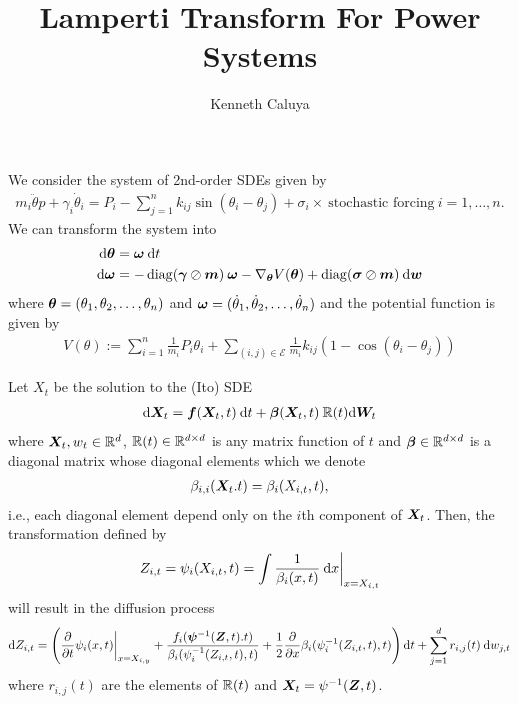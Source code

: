\documentclass[11pt,twoside,a4paper]{article}
\begin{document}
\title{\huge{Lamperti Transform For Power Systems
}}

\author{Kenneth Caluya}

\markboth{\today}{}

\maketitle
We consider the system of 2nd-order SDEs given by
\begin{align*}
    m_i\ddot{\theta}p
    +  \gamma_i \dot{\theta}_i = 
P_i - \sum_{j=1}^{n} k_{ij} \sin(\theta_i-\theta_j)+ \sigma_i \times \:\text{stochastic forcing}\: i=1,\dots,n.
\end{align*}
We can transform the system into 
\begin{align} \label{ODEsystem}
    {\rm{d}} {\bm{\theta}} &= {\bm{\omega}} \: {\rm{d}} t \nonumber \\ 
    {\rm{d}} {\bm{\omega}} & = -\operatorname{diag}({\bm{\gamma}} \oslash {\bm{m}})\: {\bm{\omega}}-\nabla_{{\bm{\theta}}} V({\bm{\theta}}) + \operatorname{diag}({\bm{\sigma}} \oslash {\bm{m}}) \: {\rm{d}} {\bm{w}}
\end{align}
where ${\bm{\theta}}=(\theta_1,\theta_2,\dots,\theta_n)$ and ${\bm{\omega}}=(\dot{\theta}_1,\dot{\theta}_2,\dots,\dot{\theta}_n)$ and the potential function is given by 
\begin{align}
    V(\theta):= \sum_{i=1}^{n} \frac{1}{m_i}P_i \theta_i + \sum_{(i,j)\in \mathcal{E}}\frac{1}{m_i}k_{ij}(1-\cos(\theta_i-\theta_j))
\end{align}
\begin{thm} \label{LampertiTransform} Let $X_t$ be the solution to the (Ito) SDE 
\begin{align}
    {\rm{d}} {\bm{X}}_t = {\bm{f}}({\bm{X}}_t,t) \: 
    {\rm{d}} t + {\bm{\beta}}({\bm{X}}_t,t) \: \mathbb{R}(t){\rm{d}} \bm{W}_t
\end{align}
where ${\bm{X}}_t,w_t \in \mathbb{R}^d$, $\mathbb{R}(t)\in \mathbb{R}^{d \times d}$ is any matrix function of $t$ and ${\bm{\beta}} \in \mathbb{R}^{d \times d} $ is a diagonal matrix whose diagonal elements which we denote 
\begin{align*}
    \beta_{i,i}({\bm{X}}_t.t)= \beta_i(X_{i,t},t),
\end{align*}
i.e., each diagonal element depend only on the $i$th component of ${\bm{X}}_t$. Then, the transformation defined by 
\begin{align} \label{ChangeofVariable}
Z_{i,t} = \psi_i(X_{i,t},t) = \int \frac{1}{\beta_i(x,t)} \: {\rm{d}} x \bigg |_{x=X_{i,t}}
\end{align}
will result in the diffusion process 
\begin{align} \label{CoVDiffusion}
    {\rm{d}} Z_{i,t} = \left(\frac{\partial}{\partial t}\psi_i(x,t)\bigg|_{x=X_{i,y}} + \frac{f_i({\bm{\psi}}^{-1}({\bm{Z}},t).t)}{\beta_i(\psi_i^{-1}(Z_{i,t},t),t)} +\frac{1}{2}  \frac{\partial}{\partial x}
    \beta_i(\psi_i^{-1}(Z_{i,t},t),t) \right){\rm{d}} t + \sum_{j=1}^{d}
 r_{i,j}(t)\: {\rm{d}} w_{j,t}
\end{align}
where $r_{i,j}(t)$ are the elements of $\mathbb{R}(t)$ and ${\bm{X}}_t = \psi^{-1}({\bm{Z}},t)$.
\end{thm}
\end{document}
